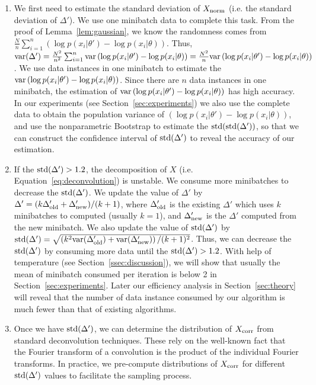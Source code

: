 \documentclass{article}
\begin{document}
\begin{enumerate}[noitemsep]
    \item We first need to estimate the standard deviation of $X_{\rm norm}$ (i.e. the standard deviation of $\Delta'$). We use one minibatch data to complete this task. From the proof of Lemma~\ref{lem:gaussian}, we know the randomness comes from $\frac{N}{n}\sum_{i=1}^n \left(\log p(x_i|\theta') - \log p(x_i|\theta) \right)$. Thus, ${\rm var}(\Delta') = \frac{N^2}{n^2}\sum_{i=1}^n{\rm var}\left (  \log p(x_i|\theta') - \log p(x_i|\theta) \right ) = \frac{N^2}{n}{\rm var}\left (  \log p(x_i|\theta') - \log p(x_i|\theta) \right )$. We use data instances in one minibatch to estimate the ${\rm var} \left (  \log p(x_i|\theta') - \log p(x_i|\theta) \right )$. Since there are $n$ data instances in one minibatch, the estimation of ${\rm var} \left (  \log p(x_i|\theta') - \log p(x_i|\theta) \right )$ has high accuracy. In our experiments (see Section~\ref{sec:experiments}) we also use the complete data to obtain the population variance of $\left (  \log p(x_i|\theta') - \log p(x_i|\theta) \right )$, and use the nonparametric Bootstrap to estimate the ${\rm std(std}(\Delta'))$, so that we can construct the confidence interval of ${\rm std}(\Delta')$ to reveal the accuracy of our estimation.

	\item If the ${\rm std}(\Delta') > 1.2$, the decomposition of $X$ (i.e. Equation~\ref{eq:deconvolution}) is unstable. We consume more minibatches to decrease the ${\rm std}(\Delta')$. We update the value of $\Delta'$ by $\Delta' = (k\Delta'_{\rm old} + \Delta'_{\rm new}) / (k+1)$, where $\Delta'_{\rm old}$ is the existing $\Delta'$ which uses $k$ minibatches to computed (usually $k=1$), and $\Delta'_{\rm new}$ is the $\Delta'$ computed from the new minibatch. We also update the value of ${\rm std}(\Delta')$ by ${\rm std}(\Delta') = \sqrt{\left ( k^2 {\rm var}(\Delta'_{\rm old}) + {\rm var}(\Delta'_{\rm new}) \right ) / (k+1)^2}$. Thus, we can decrease the ${\rm std}(\Delta')$ by consuming more data until the ${\rm std}(\Delta') > 1.2$. With help of temperature (see Section~\ref{ssec:discussion}), we will show that usually the mean of minibatch consumed per iteration is below 2 in Section~\ref{sec:experiments}. Later our efficiency analysis in Section~\ref{sec:theory} will reveal that the number of data instance consumed by our algorithm is much fewer than that of existing algorithms.

    \item Once we have ${\rm std}(\Delta')$, we can determine the distribution of $X_{\rm corr}$
    from standard deconvolution techniques. These rely on the well-known fact that the Fourier
    transform of a convolution is the product of the individual Fourier transforms. In practice, we
    pre-compute distributions of $X_{\rm corr}$ for different ${\rm std}(\Delta')$ values to
    facilitate the sampling process.
\end{enumerate}
\end{document}
